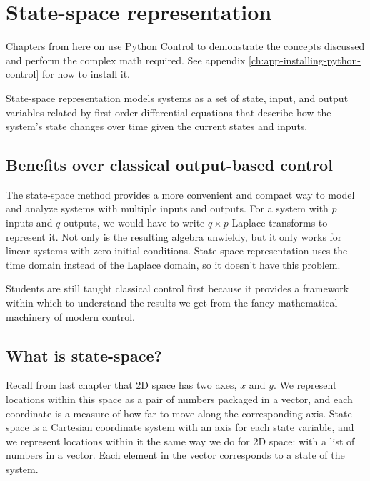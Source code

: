 
\chapter{State-space representation}

\begin{remark}
  Chapters from here on use Python Control to demonstrate the concepts discussed
  and perform the complex math required. See appendix
  \ref{ch:app-installing-python-control} for how to install it.
\end{remark}

State-space representation models \glspl{system} as a set of \gls{state}, input,
and output variables related by first-order differential equations that describe
how the system's state changes over time given the current \glspl{state} and
inputs.

\section{Benefits over classical output-based control}

The state-space method provides a more convenient and compact way to model and
analyze \glspl{system} with multiple inputs and outputs. For a system with $p$
inputs and $q$ outputs, we would have to write $q \times p$ Laplace transforms
to represent it. Not only is the resulting algebra unwieldy, but it only works
for linear systems with zero initial conditions. State-space representation uses
the time domain instead of the Laplace domain, so it doesn't have this problem.

Students are still taught classical control first because it provides a
framework within which to understand the results we get from the fancy
mathematical machinery of modern control.

\section{What is state-space?}

Recall from last chapter that 2D space has two axes, $x$ and $y$. We represent
locations within this space as a pair of numbers packaged in a vector, and each
coordinate is a measure of how far to move along the corresponding axis.
State-space is a Cartesian coordinate system with an axis for each \gls{state}
variable, and we represent locations within it the same way we do for 2D space:
with a list of numbers in a vector. Each element in the vector corresponds to a
\gls{state} of the \gls{system}.


